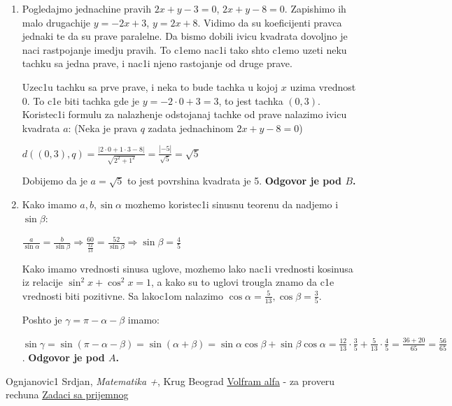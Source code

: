 \documentclass[a4paper,12pt]{article}
\newcommand{\Lat}{\fontencoding{OT1}\selectfont}
\begin{document}
\begin{enumerate}[1.]
\item Pogledajmo jednachine pravih $2x + y - 3 = 0$, $2x +y -8 = 0$. Zapishimo ih malo drugachije $y = -2x +3$, $y=  2x + 8$. Vidimo da su koeficijenti pravca jednaki te da su prave paralelne. Da bismo dobili ivicu kvadrata dovoljno je naci rastpojanje imedju pravih. To c1emo nac1i tako shto c1emo uzeti neku tachku sa jedna prave, i nac1i njeno rastojanje od druge prave.
\par Uzec1u tachku sa prve prave, i neka to bude tachka u kojoj $x$ uzima vrednost 0. To c1e biti tachka gde je $y = -2 \cdot 0 +3 = 3$, to jest tachka $(0,3)$. Koristec1i formulu za nalazhenje odstojanaj tachke od prave nalazimo ivicu kvadrata $a$: (Neka je prava $q$ zadata jednachinom $ 2x+y-8 = 0$)
\par $d((0,3), q) = \frac{|2 \cdot 0 + 1 \cdot 3 -8|}{\sqrt{2^2 + 1^2}} = \frac{|-5|}{\sqrt{5}} = \sqrt{5}$
\par Dobijemo da je $a = \sqrt{5}$ to jest povrshina kvadrata je 5. \textbf{Odgovor je pod $B$.} 


\item Kako imamo $a,b,\sin{\alpha} $ mozhemo koristec1i sinusnu teorenu da nadjemo i $\sin{\beta}$:
\par $ \frac{a}{\sin{\alpha}}= \frac{b}{\sin{\beta}}  \Longrightarrow \frac{60}{\frac{12}{13}}= \frac{52}{\sin{\beta}} \Longrightarrow \sin{\beta} = \frac{4}{5} $
\par Kako imamo vrednosti sinusa uglove, mozhemo lako nac1i vrednosti kosinusa iz relacije $\sin^2  x  +\cos^2  x  = 1$, a kako su to uglovi trougla znamo da c1e vrednosti biti pozitivne. Sa lakoc1om nalazimo $\cos{\alpha} = \frac{5}{13}, \cos{\beta} = \frac{3}{5} $.
\par Poshto je $\gamma = \pi - \alpha - \beta$ imamo: 
\par $\sin{\gamma} = \sin(\pi - \alpha - \beta)= \sin( \alpha + \beta) = \sin{\alpha}\cos{\beta} + \sin{\beta} \cos{\alpha} = \frac{12}{13}\cdot \frac{3}{5} + \frac{5}{13}  \cdot \frac{4}{5} = \frac{36+20}{65} = \frac{56}{65} $. \textbf{Odgovor je pod $A$.}


\end{enumerate}
\newpage



\begin{thebibliography}{9}

 Ognjanovic1 Srdjan, {\it Matematika {\Lat 4+}}, Krug Beograd
 \href{https://www.wolframalpha.com/}{Volfram alfa} - za proveru rechuna
 \href{http://www.matf.bg.ac.rs/files/prijemni_jun_2016_.pdf}{Zadaci sa prijemnog}

\end{thebibliography}
\end{document}
